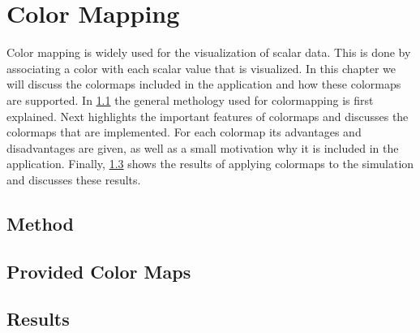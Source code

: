 
\chapter{Color Mapping} %
\label{cha:color_mapping}

Color mapping is widely used for the visualization of scalar data. This is done by associating a color with each scalar value that is visualized. In this chapter we will discuss the colormaps included in the application and how these colormaps are supported. In \cref{s:colormapping:method} the general methology used for colormapping is first explained. Next  highlights the important features of colormaps and discusses the colormaps that are implemented. For each colormap its advantages and disadvantages are given, as well as a small motivation why it is included in the application. Finally, \cref{s:colormapping:results} shows the results of applying colormaps to the simulation and discusses these results.


\section{Method}
\label{s:colormapping:method}


\section{Provided Color Maps}
\label{s:colormaps:differentmaps}


\section{Results}
\label{s:colormapping:results}



